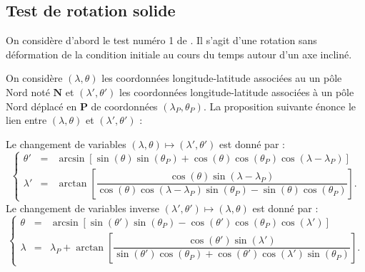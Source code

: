 \subsection{Test de rotation solide}

On considère d'abord le test numéro 1 de \cite{Williamson1992}. Il s'agit d'une rotation sans déformation de la condition initiale au cours du temps autour d'un axe incliné.

On considère $(\lambda, \theta)$ les coordonnées longitude-latitude associées au un pôle Nord noté $\mathbf{N}$ et $(\lambda', \theta')$ les coordonnées longitude-latitude associées à un pôle Nord déplacé en $\mathbf{P}$ de coordonnées $(\lambda_P, \theta_P)$. La proposition suivante énonce le lien entre $(\lambda, \theta)$ et $(\lambda', \theta')$ :

\begin{proposition}
Le changement de variables $(\lambda, \theta) \mapsto (\lambda', \theta')$ est donné par :
\begin{equation}
\label{from classic to prime}
\left\lbrace 
\begin{array}{rcl}
\theta' & = & \arcsin \left[ \sin( \theta) \sin(\theta_P) + \cos( \theta ) \cos( \theta_P) \cos( \lambda - \lambda_P ) \right] \\
\lambda' & = & \arctan \left[ \dfrac{\cos ( \theta) \sin( \lambda - \lambda_P)}{\cos( \theta) \cos( \lambda - \lambda_P) \sin( \theta_P) - \sin( \theta) \cos( \theta_P)} \right].
\end{array}
\right.
\end{equation}
Le changement de variables inverse $(\lambda', \theta')\mapsto (\lambda, \theta)$ est donné par :
\begin{equation}
\label{from prime to classic}
\left\lbrace 
\begin{array}{rcl}
\theta & = & \arcsin \left[ \sin( \theta') \sin(\theta_P) - \cos( \theta' ) \cos( \theta_P) \cos( \lambda' ) \right] \\
\lambda & = & \lambda_P + \arctan \left[ \dfrac{\cos ( \theta') \sin( \lambda ')}{\sin( \theta') \cos( \theta_P) + \cos ( \theta') \cos( \lambda') \sin ( \theta_P)} \right].
\end{array}
\right.
\end{equation}
\end{proposition}

